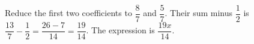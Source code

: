 Reduce the first two coefficients to $\dfrac{8}{7}$ and $\dfrac{5}{7}$. Their sum minus $\dfrac{1}{2}$ is $\dfrac{13}{7}-\dfrac{1}{2}=\dfrac{26-7}{14}=\dfrac{19}{14}$. The expression is $\boxed{\dfrac{19 x}{14}}$.

